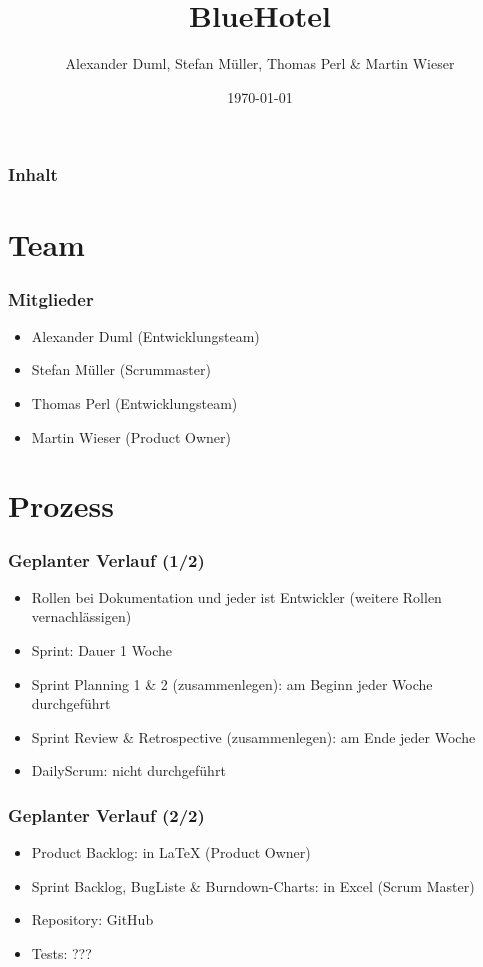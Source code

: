 \documentclass{beamer}
\begin{document}
\title{BlueHotel}  
\author{Alexander Duml, Stefan M\"uller, Thomas Perl \& Martin Wieser}
\date{\today} 

\begin{frame}
\titlepage
\end{frame} 

\begin{frame}
\frametitle{Inhalt}\tableofcontents
\end{frame} 



\section{Team} 

\begin{frame}
\frametitle{Mitglieder} 
\begin{itemize}
\item Alexander Duml (Entwicklungsteam)
\item Stefan M\"uller (Scrummaster)
\item Thomas Perl (Entwicklungsteam)
\item Martin Wieser (Product Owner)
\end{itemize}
\end{frame}

\section{Prozess} 

\begin{frame}
\frametitle{Geplanter Verlauf (1/2)} 
\begin{itemize}
\item Rollen bei Dokumentation und jeder ist Entwickler (weitere Rollen vernachl\"assigen)
\item Sprint: Dauer 1 Woche
\end{itemize}
\begin{itemize}
\item Sprint Planning 1 \& 2 (zusammenlegen): am Beginn jeder Woche durchgef\"uhrt
\item Sprint Review \& Retrospective (zusammenlegen): am Ende jeder Woche
\item DailyScrum: nicht durchgef\"uhrt
\end{itemize}
\end{frame}

\begin{frame}
\frametitle{Geplanter Verlauf (2/2)} 
\begin{itemize}
\item Product Backlog: in LaTeX (Product Owner)
\item Sprint Backlog, BugListe \& Burndown-Charts: in Excel (Scrum Master)
\item Repository: GitHub
\item Tests: ???
\end{itemize}
\end{frame}
\end{document}
